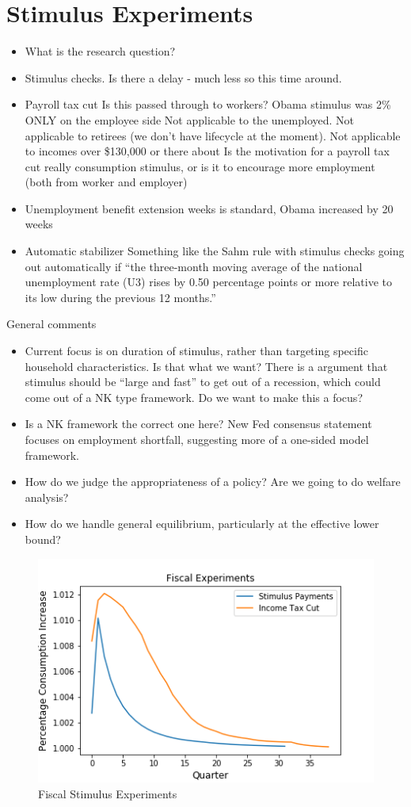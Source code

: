 \documentclass[]{article}
\begin{document}
\section{Stimulus Experiments}


\begin{itemize}
	\item What is the research question?
	\item Stimulus checks. Is there a delay - much less so this time around.
	\item Payroll tax cut
	\subitem Is this passed through to workers? Obama stimulus was 2\% ONLY on the employee side
	\subitem Not applicable to the unemployed.
	\subitem Not applicable to retirees (we don't have lifecycle at the moment).
	\subitem Not applicable to incomes over \$130,000 or there about
	\subitem Is the motivation for a payroll tax cut really consumption stimulus, or is it to encourage more employment (both from worker and employer)
	\item Unemployment benefit extension
	 weeks is standard, Obama increased by 20 weeks
	\item Automatic stabilizer
	\subitem Something like the Sahm rule with stimulus checks going out automatically if ``the three-month moving average of the national unemployment rate (U3) rises by 0.50 percentage points or more relative to its low during the previous 12 months.''
\end{itemize}

General comments
\begin{itemize}
	\item Current focus is on duration of stimulus, rather than targeting specific household characteristics. Is that what we want? There is a argument that stimulus should be ``large and fast'' to get out of a recession, which could come out of a NK type framework. Do we want to make this a focus?
	\item Is a NK framework the correct one here? New Fed consensus statement focuses on employment shortfall, suggesting more of a one-sided model framework.
	\item How do we judge the appropriateness of a policy? Are we going to do welfare analysis?
	\item How do we handle general equilibrium, particularly at the effective lower bound?
\end{itemize}

	\begin{figure}
	\begin{centering}
		\includegraphics[scale=0.85]{./Figures/FiscalExperiments.png}
		\caption{Fiscal Stimulus Experiments}
		\label{fig:Fiscal_experiments}
	\end{centering}
	\end{figure}
\end{document}
